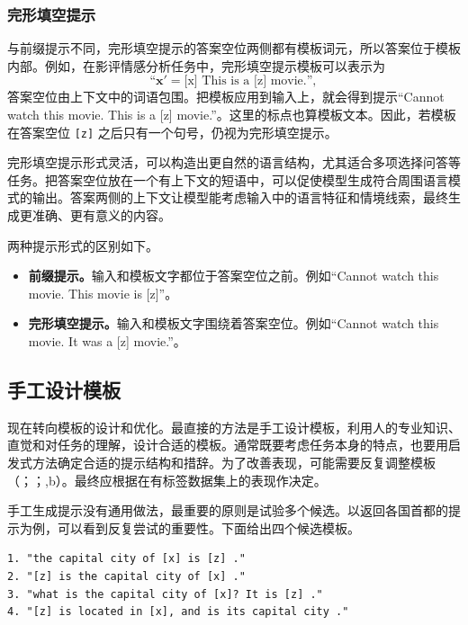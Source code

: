 \subsubsection{完形填空提示}
与前缀提示不同，完形填空提示的答案空位两侧都有模板词元，所以答案位于模板内部。例如，在影评情感分析任务中，完形填空提示模板可以表示为
\begin{equation}
\text{“}\symbf{x}'=\text{[x] This is a [z] movie.}\text{”},
\tag{3.7}
\end{equation}
答案空位由上下文中的词语包围。把模板应用到输入上，就会得到提示“Cannot watch this movie. This is a [z] movie.”。这里的标点也算模板文本。因此，若模板在答案空位 \texttt{[z]} 之后只有一个句号，仍视为完形填空提示。

完形填空提示形式灵活，可以构造出更自然的语言结构，尤其适合多项选择问答等任务。把答案空位放在一个有上下文的短语中，可以促使模型生成符合周围语言模式的输出。答案两侧的上下文让模型能考虑输入中的语言特征和情境线索，最终生成更准确、更有意义的内容。

两种提示形式的区别如下。
\begin{itemize}
\item \textbf{前缀提示。}输入和模板文字都位于答案空位之前。例如“Cannot watch this movie. This movie is [z]”。
\item \textbf{完形填空提示。}输入和模板文字围绕着答案空位。例如“Cannot watch this movie. It was a [z] movie.”。
\end{itemize}

\subsection{手工设计模板}
现在转向模板的设计和优化。最直接的方法是手工设计模板，利用人的专业知识、直觉和对任务的理解，设计合适的模板。通常既要考虑任务本身的特点，也要用启发式方法确定合适的提示结构和措辞。为了改善表现，可能需要反复调整模板（；；,b）。最终应根据在有标签数据集上的表现作决定。

手工生成提示没有通用做法，最重要的原则是试验多个候选。以返回各国首都的提示为例，可以看到反复尝试的重要性。下面给出四个候选模板。
\begin{lstlisting}[caption={国家首都查询的提示模板},label={lst:ch03-capitals}]
1. "the capital city of [x] is [z] ."
2. "[z] is the capital city of [x] ."
3. "what is the capital city of [x]? It is [z] ."
4. "[z] is located in [x], and is its capital city ."
\end{lstlisting}


